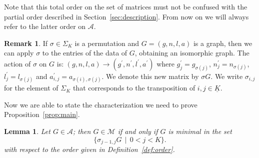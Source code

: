 \documentclass{amsart}
\theoremstyle{plain}
\newtheorem{lemma}[theorem]{Lemma}
\theoremstyle{definition}
\newtheorem{remark}[theorem]{Remark}
\newcommand{\ubar}[1]{\underline{#1}}
\begin{document}
Note that this total order on the set of matrices must not be confused
with the partial order described in
Section~\ref{sec:description}. From now on we will always refer to the
latter order on $\mathcal{A}$.

\begin{remark}
  If $\sigma \in \Sigma_K$ is a permutation and $G = (g, n, l, a)$ is
  a graph, then we can apply $\sigma$ to the entries of the data of
  $G$, obtaining an isomorphic graph. The action of $\sigma$ on $G$
  is: $(g,n,l,a)\to (g^\prime,n^\prime,l^\prime,a^\prime)$ where
  $g^\prime_j=g_{\sigma(j)}$, $n^\prime_j=n_{\sigma(j)}$,
  $l^\prime_j=l_{\sigma(j)}$ and $a^\prime_{i,j} =
  a_{\sigma(i),\sigma(j)}$. We denote this new matrix by $\sigma
  G$. We write $\sigma_{i,j}$ for the element of $\Sigma_K$ that
  corresponds to the transposition of $i, j \in \ubar{K}$.
\end{remark}

Now we are able to state the characterization we need to prove
Proposition~\ref{prop:main}.

\begin{lemma}\label{lemma:char}
  Let $G \in \mathcal{A}$; then $G \in \mathcal{M}$ if and only if $G$
  is minimal in the set
  \[
  \bigl\{ \sigma_{j-1,j} G \,\mid\, 0<j<K \bigr\}\text{.}
  \]
  with respect to the order given in Definition~\ref{def:order}.
\end{lemma}
\end{document}
